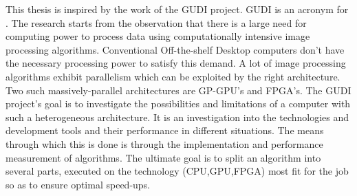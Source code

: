 This thesis is inspired by the work of the GUDI project. GUDI is an acronym for . The research starts from the observation that there is a large need for computing power to process data using computationally intensive image processing algorithms. Conventional Off-the-shelf Desktop computers don't have the necessary processing power to satisfy this demand. A lot of image processing algorithms exhibit parallelism which can be exploited by the right architecture. Two such massively-parallel architectures are GP-GPU's and FPGA's. The GUDI project's goal is to investigate the possibilities and limitations of a computer with such a heterogeneous architecture. It is an investigation into the technologies and development tools and their performance in different situations. The means through which this is done is through the implementation and performance measurement of algorithms. The ultimate goal is to split an algorithm into several parts, executed on the technology (CPU,GPU,FPGA) most fit for the job so as to ensure optimal speed-ups.




